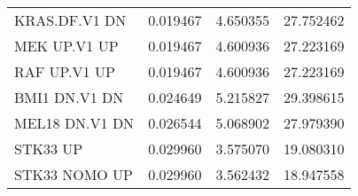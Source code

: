 \begin{tabular}{lrrr}
                     KRAS.DF.V1 DN &          0.019467 &  4.650355 &       27.752462 \\
                      MEK UP.V1 UP &          0.019467 &  4.600936 &       27.223169 \\
                      RAF UP.V1 UP &          0.019467 &  4.600936 &       27.223169 \\
                     BMI1 DN.V1 DN &          0.024649 &  5.215827 &       29.398615 \\
                    MEL18 DN.V1 DN &          0.026544 &  5.068902 &       27.979390 \\
                          STK33 UP &          0.029960 &  3.575070 &       19.080310 \\
                     STK33 NOMO UP &          0.029960 &  3.562432 &       18.947558 \\
\bottomrule
\end{tabular}
